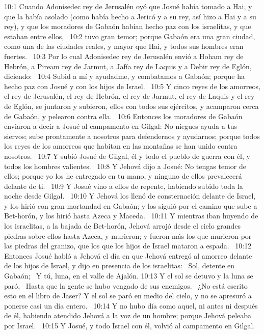 10:1 Cuando Adonisedec rey de Jerusalén oyó que Josué había tomado a Hai, y que la había asolado (como había hecho a Jericó y a su rey, así hizo a Hai y a su rey), y que los moradores de Gabaón habían hecho paz con los israelitas, y que estaban entre ellos,  
10:2 tuvo gran temor; porque Gabaón era una gran ciudad, como una de las ciudades reales, y mayor que Hai, y todos sus hombres eran fuertes.  
10:3 Por lo cual Adonisedec rey de Jerusalén envió a Hoham rey de Hebrón, a Piream rey de Jarmut, a Jafía rey de Laquis y a Debir rey de Eglón, diciendo:  
10:4 Subid a mí y ayudadme, y combatamos a Gabaón; porque ha hecho paz con Josué y con los hijos de Israel.  
10:5 Y cinco reyes de los amorreos, el rey de Jerusalén, el rey de Hebrón, el rey de Jarmut, el rey de Laquis y el rey de Eglón, se juntaron y subieron, ellos con todos sus ejércitos, y acamparon cerca de Gabaón, y pelearon contra ella.  
10:6 Entonces los moradores de Gabaón enviaron a decir a Josué al campamento en Gilgal: No niegues ayuda a tus siervos; sube prontamente a nosotros para defendernos y ayudarnos; porque todos los reyes de los amorreos que habitan en las montañas se han unido contra nosotros.  
10:7 Y subió Josué de Gilgal, él y todo el pueblo de guerra con él, y todos los hombres valientes.  
10:8 Y Jehová dijo a Josué: No tengas temor de ellos; porque yo los he entregado en tu mano, y ninguno de ellos prevalecerá delante de ti.  
10:9 Y Josué vino a ellos de repente, habiendo subido toda la noche desde Gilgal.  
10:10 Y Jehová los llenó de consternación delante de Israel, y los hirió con gran mortandad en Gabaón; y los siguió por el camino que sube a Bet-horón, y los hirió hasta Azeca y Maceda.  
10:11 Y mientras iban huyendo de los israelitas, a la bajada de Bet-horón, Jehová arrojó desde el cielo grandes piedras sobre ellos hasta Azeca, y murieron; y fueron más los que murieron por las piedras del granizo, que los que los hijos de Israel mataron a espada.  
10:12 Entonces Josué habló a Jehová el día en que Jehová entregó al amorreo delante de los hijos de Israel, y dijo en presencia de los israelitas:  
Sol, detente en Gabaón;  
Y tú, luna, en el valle de Ajalón. 
10:13 Y el sol se detuvo y la luna se paró,  
Hasta que la gente se hubo vengado de sus enemigos.  
¿No está escrito esto en el libro de Jaser? Y el sol se paró en medio del cielo, y no se apresuró a ponerse casi un día entero.  
10:14 Y no hubo día como aquel, ni antes ni después de él, habiendo atendido Jehová a la voz de un hombre; porque Jehová peleaba por Israel.  
10:15 Y Josué, y todo Israel con él, volvió al campamento en Gilgal.  
